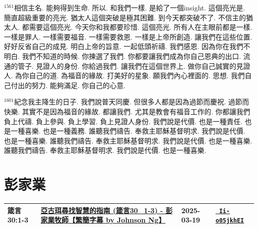 \documentclass{book}
\begin{document}
$^{1561}$相信主名.
能夠得到生命.
所以.
和我們一樣.
是給了一個insight.
這個亮光是.
簡直超級重要的亮光.
猶太人這個突破是極其困難.
到今天都突破不了.
不信主的猶太人.
都需要這個亮光.
今天你和我都要珍惜.
這個亮光.
所有人在主眼前都是一樣.
一樣是罪人.
一樣需要福音.
一樣需要救恩.
一樣是上帝所創造.
讓我們在這些位置.
好好反省自己的成見.
明白上帝的旨意.
一起低頭祈禱.
我們感恩.
因為你在我們不明白.
我們不知道的時候.
你揀選了我們.
你都要讓我們成為你自己恩典的出口.
流通的管子.
見證人的身份.
你給過我們.
讓我們在這個世界上.
做你自己誠實的見證人.
為你自己的道.
為福音的緣故.
打美好的星象.
願我們內心裡面的.
思想.
我們自己付出的努力.
能夠滿足.
你自己的心意.

$^{1601}$紀念我主降生的日子.
我們說普天同慶.
但很多人都是因為過節而慶祝.
過節而快樂.
其實不是因為福音的緣故.
都讓我們.
尤其是教會有福音工作的.
你都讓我們負上代禱.
負上參與.
負上學習.
負上見證人身份.
我們說是代價.
也是一種責任.
也是一種喜樂.
也是一種義務.
誰聽我們禱告.
奉救主耶穌基督明求.
我們說是代價.
也是一種喜樂.
誰聽我們禱告.
奉救主耶穌基督明求.
我們說是代價.
也是一種喜樂.
誰聽我們禱告.
奉救主耶穌基督明求.
我們說是代價.
也是一種喜樂.
\newpage



\chapter{彭家業}\label{ch:preacher2}
\begin{multicols}{3}
\minitoc
\end{multicols}
{ \scriptsize


\begin{xltabular}{\textwidth}{|p{0.15\textwidth} p{0.6\textwidth}|p{0.07\textwidth} p{0.1\textwidth}|}
\hline
箴言 30:1-3 & \hyperref[sec:Ii_o05jkhEI]{亞古珥尋找智慧的指南 (箴言30\_1-3) - 彭家業牧師【繁簡字幕 by Johnson Ng】} & 2025-03-19 & \href{https://youtube.com/watch?v=Ii-o05jkhEI}{\texttt{ Ii-o05jkhEI}} \\
\hline
\end{xltabular}
}
\newpage
\end{document}
